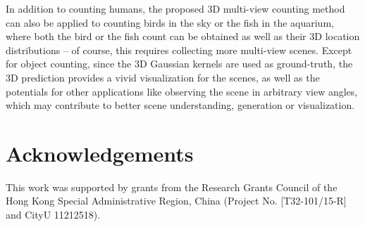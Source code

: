 \documentclass[letterpaper]{article} %
\begin{document}
In addition to counting humans, the proposed 3D multi-view counting method can also be applied to counting birds in the sky or the fish in the aquarium, where both the bird or the fish count can be obtained as well as their 3D location distributions -- of course, this requires collecting more multi-view scenes. Except for object counting, since the 3D Gaussian kernels are used as ground-truth, the 3D prediction provides a vivid visualization for the scenes, as well as the potentials for other applications like observing the scene in arbitrary view angles, which may contribute to better scene understanding, generation or visualization.


\section{Acknowledgements}
This work was supported by grants from the Research Grants Council of the Hong Kong Special Administrative Region, China (Project No. [T32-101/15-R] and CityU 11212518).

{\small


}
\end{document}

